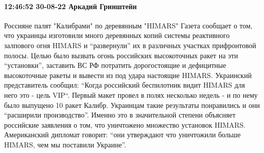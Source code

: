  
 
 
 
 

\paragraph{12:46:52 30-08-22 Аркадий Гринштейн}

Россияне палят "Калибрами" по деревянным "HIMARS"
Газета сообщает о том, что украинцы изготовили много деревянных копий
системы реактивного залпового огня HIMARS и “развернули” их в различных
участках прифронтовой полосы.
Целью было вызвать огонь российских высокоточных ракет на эти
“установки”, заставить ВС РФ потратить дорогостоящие и дефицитные
высокоточные ракеты и вывести из под удара настоящие HIMARS.
Украинский представитель сообщил: “Когда российский беспилотник видит HIMARS для него это - цель VIP“.
Первый макет провел в полях несколько недель - и по нему было выпущено
10 ракет Калибр. Украинцам такие результаты понравились и они “расширили
производство”. Именно это в значительной степени объясняет российские
заявления о том, что уничтожено множество установок HIMARS. Американский
дипломат говорит: “они утверждают что уничтожили больше HIMARS, чем мы
поставили Украине”.
